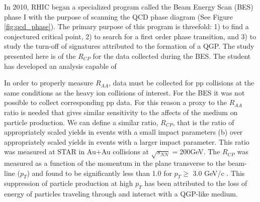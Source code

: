 In 2010, RHIC began a specialized program called the Beam Energy Scan (BES) phase I with the purpose of scanning the QCD phase diagram (See Figure \ref{fig:qcd_phase}). The primary purpose of this program is threefold: 1) to find a conjectured critical point, 2) to search for a first order phase transition, and 3) to study the turn-off of signatures attributed to the formation of a QGP. The study presented here is of the $R_{CP}$ for the data collected during the BES. The student has developed an analysis capable of 

In order to properly measure $R_{AA}$, data must be collected for pp collisions at the same conditions as the heavy ion collisions of interest. For the BES it was not possible to collect corresponding pp data. For this reason a proxy to the $R_{AA}$ ratio is needed that gives similar sensitivity to the affects of the medium on particle production. We can define a similar ratio, $R_{CP}$, that is the ratio of appropriately scaled yields in events with a small impact parameters (b) over appropriately scaled yields in events with a larger impact parameter. This ratio was measured at STAR in Au$+$Au collisions at $\sqrt{s_{NN}}=$200GeV. The $R_{CP}$ was measured as a function of the momentum in the plane transverse to the beam-line ($p_T$) and found to be significantly less than 1.0 for $p_T \geq $ 3.0 GeV/c \cite{}. This suppression of particle production at high $p_T$ has been attributed to the loss of energy of particles traveling through and interact with a QGP-like medium.

